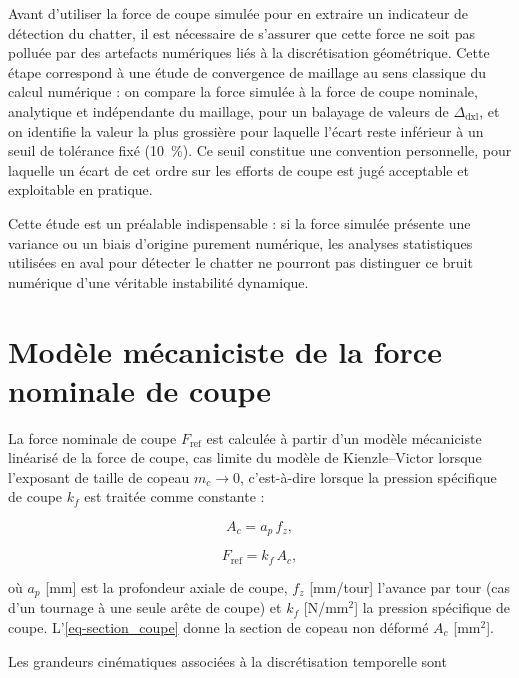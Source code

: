 \documentclass[
    11pt,
    a4paper
]{article}
\newcommand{\ap}{a_p}
\newcommand{\fz}{f_z}
\newcommand{\kf}{k_f}
\newcommand{\Ac}{A_c}
\newcommand{\Fref}{F_{\mathrm{ref}}}
\newcommand{\dxlsize}{\Delta_{\mathrm{dxl}}}
\begin{document}
Avant d'utiliser la force de coupe simulée pour en extraire un indicateur de détection du
chatter, il est nécessaire de s'assurer que cette force ne soit pas polluée par des
artefacts numériques liés à la discrétisation géométrique. Cette étape correspond à une
étude de convergence de maillage au sens classique du calcul numérique : on compare la force simulée à la force de coupe nominale, analytique et indépendante du
maillage, pour un balayage de valeurs de \(\dxlsize\), et on identifie la valeur la plus
grossière pour laquelle l'écart reste inférieur à un seuil de tolérance fixé (\SI{10}{\percent}).
Ce seuil constitue une convention personnelle, pour laquelle un écart de cet ordre sur les
efforts de coupe est jugé acceptable et exploitable en pratique.

Cette étude est un préalable indispensable : si la force simulée présente une variance ou
un biais d'origine purement numérique, les analyses statistiques utilisées en aval pour
détecter le chatter ne pourront pas distinguer ce bruit numérique d'une véritable
instabilité dynamique.

\section{Modèle mécaniciste de la force nominale de coupe}
\label{sec-modele_force_ref}

La force nominale de coupe \(\Fref\) est calculée à partir d'un modèle mécaniciste linéarisé de
la force de coupe, cas limite du modèle de Kienzle--Victor
lorsque l'exposant de taille de copeau \(m_c \to 0\), c'est-à-dire lorsque la pression
spécifique de coupe \(\kf\) est traitée comme constante :

\begin{equation}
    \Ac = \ap \, \fz,
    \label{eq-section_coupe}
\end{equation}

\begin{equation}
    \Fref = \kf \, \Ac,
    \label{eq-force_ref}
\end{equation}

où \(\ap\) [mm] est la profondeur axiale de coupe, \(\fz\) [mm/tour] l'avance par tour
(cas d'un tournage à une seule arête de coupe) et \(\kf\) [N/mm\(^2\)] la pression
spécifique de coupe. L'{}\cref{eq-section_coupe} donne la section de copeau non déformé
\(\Ac\) [mm\(^2\)].

Les grandeurs cinématiques associées à la discrétisation temporelle sont
\end{document}
